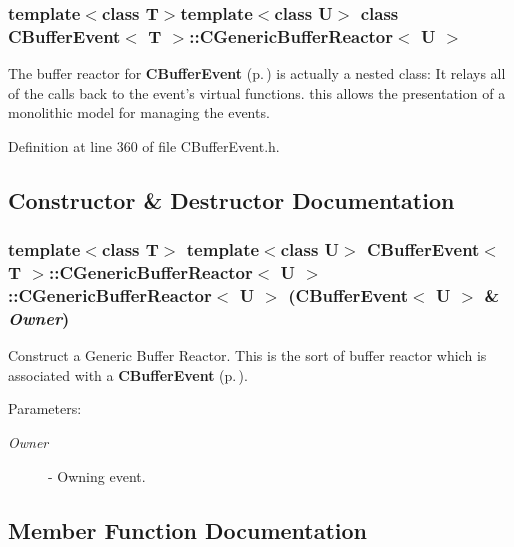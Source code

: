 \subsubsection*{template$<$class T$>$template$<$class U$>$ class CBuffer\-Event$<$ T $>$::CGeneric\-Buffer\-Reactor$<$ U $>$}

The buffer reactor for {\bf CBuffer\-Event} {\rm (p.\,\pageref{classCBufferEvent})} is actually a nested class: It relays all of the calls back to the event's virtual functions. this allows the presentation of a monolithic model for managing the  events. 



Definition at line 360 of file CBuffer\-Event.h.

\subsection{Constructor \& Destructor Documentation}
\subsubsection{\setlength{\rightskip}{0pt plus 5cm}template$<$class T$>$ template$<$class U$>$ {\bf CBuffer\-Event}$<$ T $>$::CGeneric\-Buffer\-Reactor$<$ U $>$::CGeneric\-Buffer\-Reactor$<$ U $>$ ({\bf CBuffer\-Event}$<$ U $>$ \& {\em Owner})}\label{classCBufferEvent_1_1CGenericBufferReactor_a0}


Construct a Generic Buffer Reactor. This is the sort of buffer reactor which is associated with a {\bf CBuffer\-Event} {\rm (p.\,\pageref{classCBufferEvent})}. \begin{Desc}
\item[Parameters: ]\par
\begin{description}
\item[{\em 
Owner}]- Owning event. \end{description}
\end{Desc}


\subsection{Member Function Documentation}
